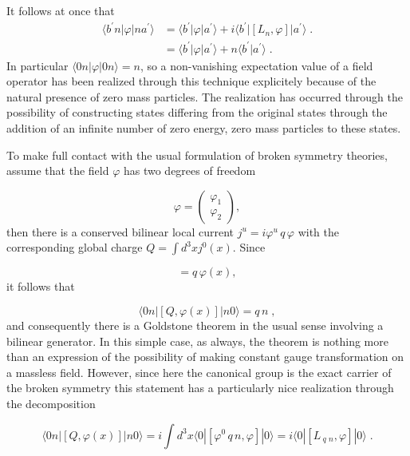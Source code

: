 \documentclass[%
  12pt,
  paper=letter,
  abstracton,
  pagesize=auto,
  version=last,
  DIV=calc
  ]{scrartcl}
\begin{document}
It follows at once that
\begin{align*}
\langle b^{\prime} n |\varphi| n a^{\prime}\rangle &= \langle b^{\prime} |\varphi
  |a^{\prime}\rangle + i \langle b^{\prime}| [L_n, \varphi]|a^{\prime}\rangle \;.\\
&= \langle b^{\prime} |\varphi |a^{\prime}\rangle + n \langle
  b^{\prime}|a^{\prime}\rangle \; .
\end{align*}
In particular $\langle 0 n | \varphi | 0 n\rangle = n$, so a non-vanishing
expectation value of a field operator has been realized through this
technique explicitely because of the natural presence of zero mass
particles.  The realization has occurred through the possibility of
constructing states differing from the original states through the
addition of an infinite number of zero energy, zero mass particles to
these states.

To make full contact with the usual formulation of broken symmetry
theories, assume that the field $\varphi$ has two degrees of freedom

\begin{equation*}
\varphi = \left( \begin{array}{c} \varphi_1\\ \varphi_2 \end{array} \right),
\end{equation*}
then there is a conserved bilinear local current $j^u = i \varphi^u\,
q\, \varphi$ with the corresponding global charge $Q = \int d^3 x j^0(x)$.  Since

\begin{equation*}
[Q, \varphi (x)] = q\, {\varphi (x)},
\end{equation*}
it follows that

\begin{equation*}
\langle 0 n | [Q, \varphi(x)] | n 0\rangle = q \,n \; ,
\end{equation*}
and consequently there is a Goldstone theorem in the usual sense
involving a bilinear generator.  In this simple case, as always, the
theorem is nothing more than an expression of the possibility of
making constant gauge transformation on a massless field.  However,
since here the canonical group is the exact carrier of the broken
symmetry this statement has a particularly nice realization through
the decomposition

\begin{equation*}
\langle 0 n | [Q, \varphi(x)] | n 0\rangle = i \int d^3 x \langle 0 | [ \varphi^{0}\, q\, n, \varphi] | 0\rangle
= i \langle 0 | [ L\,_q\,_n, \varphi ] | 0\rangle\;.
\end{equation*}
\end{document}
